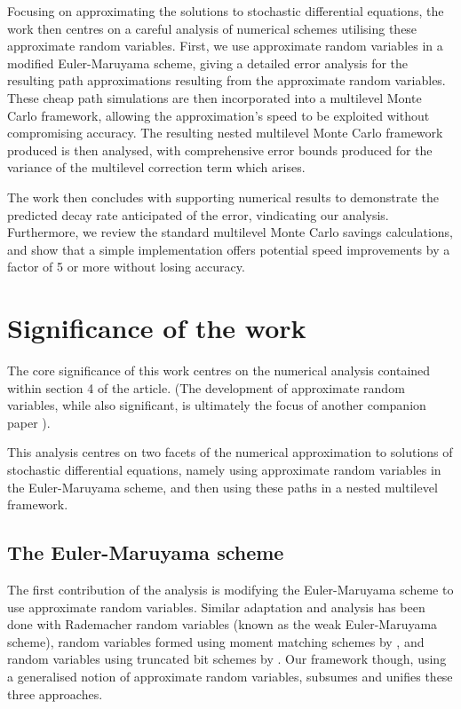 \documentclass[twocolumn,10pt]{extarticle}
\begin{document}
Focusing on approximating the solutions to stochastic differential equations, the work then centres on a careful analysis of numerical schemes utilising these approximate random variables. First, we use approximate random variables in a modified Euler-Maruyama scheme, giving a detailed error analysis for the resulting path approximations resulting from the approximate random variables. These cheap path simulations are then incorporated into a multilevel Monte Carlo framework, allowing the approximation's speed to be exploited without compromising accuracy. The resulting nested multilevel Monte Carlo framework produced is then analysed, with comprehensive error bounds produced for the variance of the multilevel correction term which arises. 

The work then concludes with supporting numerical results to demonstrate the predicted decay rate anticipated of the error, vindicating our analysis. Furthermore, we review the standard multilevel Monte Carlo savings calculations, and show that a simple implementation offers potential speed improvements by a factor of 5 or more without losing accuracy. 

\section{Significance of the work}

The core significance of this work centres on the numerical analysis contained within section 4 of the article. (The development of approximate random variables, while also significant, is ultimately the focus of another companion paper \citep{sheridanmethven2020approximating}).

This analysis centres on two facets of the numerical approximation to solutions of stochastic differential equations, namely using approximate random variables in the Euler-Maruyama scheme, and then using these paths in a nested multilevel framework. 

\subsection{The Euler-Maruyama scheme}

The first contribution of the analysis is modifying the Euler-Maruyama scheme to use approximate random variables. Similar adaptation and analysis has been done with Rademacher random variables (known as the weak Euler-Maruyama scheme), random variables formed using moment matching schemes by \citet*{mss15}, and random variables using truncated bit schemes by \citet*{ghmr19}. Our framework though, using a generalised notion of approximate random variables, subsumes and unifies these three approaches. 
\end{document}
